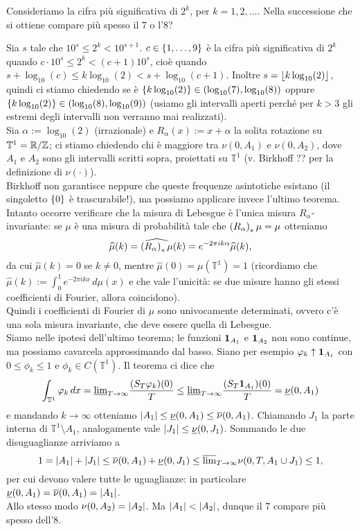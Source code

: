 \begin{esercizio}Consideriamo la cifra più significativa di $2^k$, per $k=1,2,\dots$.
Nella successione che si ottiene compare più spesso il $7$ o l'$8$?
\end{esercizio}

\begin{soluz}Sia $s$ tale che $10^s\le 2^k<10^{s+1}$. $c\in\left\{1,\dots,9\right\}$ è la cifra più significativa di $2^k$
quando $c\cdot 10^s\le 2^k<(c+1)10^s$, cioè quando $s+\log_{10}(c)\le k\log_{10}(2)<s+\log_{10}(c+1)$.
Inoltre $s=\left\lfloor k\log_{10}(2)\right\rfloor$, quindi ci stiamo chiedendo se è
$\left\{k\log_{10}(2)\right\}\in\left(\log_{10}(7),\log_{10}(8)\right)$ oppure $\left\{k\log_{10}(2)\right\}\in\left(\log_{10}(8),\log_{10}(9)\right)$
(usiamo gli intervalli aperti perché per $k>3$ gli estremi degli intervalli non verranno mai realizzati). \\
Sia $\alpha:=\log_{10}(2)$ (irrazionale) e $R_\alpha(x):=x+\alpha$ la solita rotazione
su $\mathbb{T}^1=\mathbb{R}/\mathbb{Z}$; ci stiamo chiedendo chi è maggiore tra $\nu(0,A_1)$ e $\nu(0,A_2)$, dove $A_1$
e $A_2$ sono gli intervalli scritti sopra, proiettati su $\mathbb{T}^1$ (v. Birkhoff ?? per la definizione di $\nu(\cdot)$). \\
Birkhoff non garantisce neppure che queste frequenze asintotiche esistano (il singoletto $\left\{0\right\}$ è trascurabile!),
ma possiamo applicare invece l'ultimo teorema. \\
Intanto occorre verificare che la misura di Lebesgue è l'unica misura $R_\alpha$-invariante:
se $\mu$ è una misura di probabilità tale che $\left(R_\alpha\right)_*\mu=\mu$ otteniamo
\[ \widehat{\mu}(k)=\widehat{\left(R_\alpha\right)_*\mu}(k)=e^{-2\pi i k\alpha}\widehat{\mu}(k), \]
da cui $\widehat{\mu}(k)=0$ se $k\neq 0$, mentre $\widehat{\mu}(0)=\mu(\mathbb{T}^1)=1$
(ricordiamo che $\widehat{\mu}(k):=\int_0^1 e^{-2\pi i kx}\,d\mu(x)$
e che vale l'unicità: se due misure hanno gli stessi coefficienti di Fourier, allora coincidono). \\
Quindi i coefficienti di Fourier di $\mu$ sono univocamente determinati, ovvero c'è una sola misura invariante,
che deve essere quella di Lebesgue. \\
Siamo nelle ipotesi dell'ultimo teorema; le funzioni $\bm{1}_{A_1}$ e $\bm{1}_{A_2}$ non sono continue, ma possiamo cavarcela
approssimando dal basso. Siano per esempio $\varphi_k\uparrow \bm{1}_{A_1}$ con $0\le\phi_k\le 1$ e $\phi_k\in C(\mathbb{T}^1)$.
Il teorema ci dice che
\[ \int_{\mathbb{T}^1} \varphi_k\,dx=\underline{\lim}_{T\to\infty}\frac{(S_T\varphi_k)(0)}{T}
\le\underline{\lim}_{T\to\infty}\frac{(S_T\bm{1}_{A_1})(0)}{T}=\underline{\nu}(0,A_1) \]
e mandando $k\to\infty$ otteniamo $\left|A_1\right|\le\underline{\nu}(0,A_1)\le\overline{\nu}(0,A_1)$.
Chiamando $J_1$ la parte interna di $\mathbb{T}^1\setminus A_1$,
analogamente vale $\left|J_1\right|\le\underline{\nu}(0,J_1)$. Sommando le due disuguaglianze arriviamo a
\[ 1=\left|A_1\right|+\left|J_1\right|\le\overline{\nu}(0,A_1)+\underline{\nu}(0,J_1)\le \overline{\lim}_{T\to\infty}\nu(0,T,A_1\cup J_1)\le 1, \]
per cui devono valere tutte le uguaglianze: in particolare $\underline{\nu}(0,A_1)=\overline{\nu}(0,A_1)=\left|A_1\right|$. \\
Allo stesso modo $\nu(0,A_2)=\left|A_2\right|$. Ma $\left|A_1\right|<\left|A_2\right|$, dunque il $7$ compare più spesso dell'$8$.
\end{soluz}

